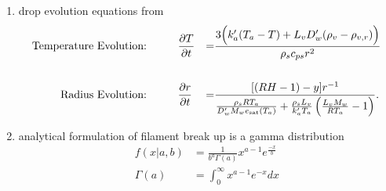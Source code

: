 \documentclass[10pt,a4paper]{article}
\begin{document}
\begin{enumerate}
\item drop evolution equations from \citet{Pruppacher1978}
\begin{align*}
\text{Temperature Evolution:}&\hspace*{1cm}\frac{\partial T}{\partial t} &=& \frac{3\Big(k_a'(T_a-T)+L_vD_w'(\rho_v-\rho_{v,r})\Big)}{\rho_sc_{ps}r^2}\\
\vspace*{0.25cm}\\
\text{Radius Evolution:}&\hspace*{1cm}\frac{\partial r}{\partial t} &=& \frac{[(RH-1)-y]r^{-1}}{\frac{\rho_sRT_a}{D_w'M_we_{\text{sat}}(T_a)}+\frac{\rho_sL_v}{k_a'T_a}\left(\frac{L_vM_w}{RT_a}-1\right)}.
\end{align*}
\item analytical formulation of filament break up is a gamma distribution
\begin{align*}
f(x|a,b) &= \frac{1}{b^a\Gamma(a)}x^{a-1}e^{\frac{-x}{b}}\\
\Gamma(a) &= \int_0^\infty x^{a-1}e^{-x}dx
\end{align*}
\end{enumerate}
\end{document}
